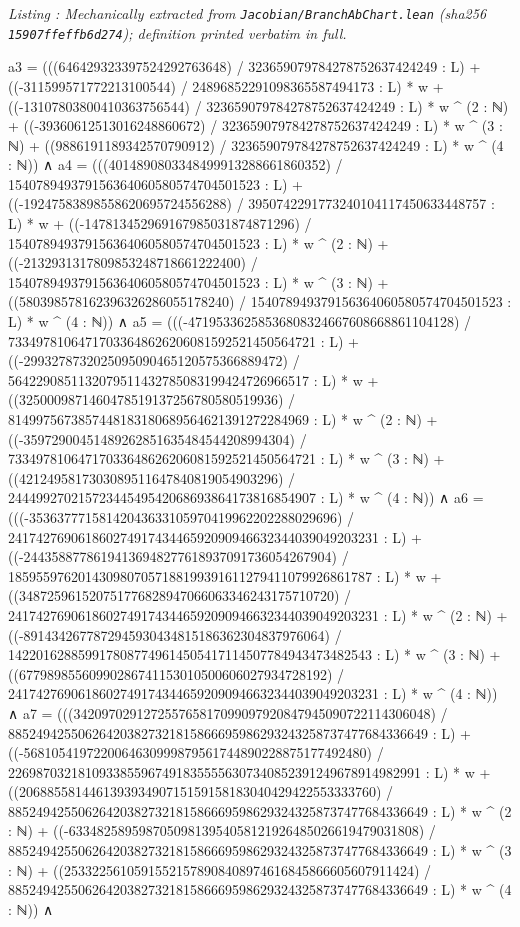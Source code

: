 \documentclass[a4paper,11pt]{article}
\newcounter{leanlisting}
\newenvironment{leanlisting}[2]{%
  \refstepcounter{leanlisting}\label{#2}%
  \begin{center}\textit{\small Listing \theleanlisting: #1}\end{center}%
  \Verbatim[breaklines=true,breakanywhere=true,fontsize=\footnotesize,frame=single,framesep=4pt,rulecolor=\color{gray!50},fillcolor=\color{gray!5}]%
}{%
  \endVerbatim%
}
\theoremstyle{plain}
\theoremstyle{definition}
\theoremstyle{remark}
\begin{document}
\begin{leanlisting}{Mechanically extracted from \texttt{Jacobian/BranchAbChart.lean} (sha256 \texttt{15907ffeffb6d274}); definition printed verbatim in full.}{lst:def-chartclass}
      a3 = (((646429323397524292763648) / 323659079784278752637424249 : L) + ((-311599571772213100544) / 24896852291098365587494173 : L) * w + ((-13107803800410363756544) / 323659079784278752637424249 : L) * w ^ (2 : ℕ) + ((-39360612513016248860672) / 323659079784278752637424249 : L) * w ^ (3 : ℕ) + ((9886191189342570790912) / 323659079784278752637424249 : L) * w ^ (4 : ℕ)) ∧
      a4 = (((4014890803348499913288661860352) / 154078949379156364060580574704501523 : L) + ((-19247583898558620695724556288) / 3950742291773240104117450633448757 : L) * w + ((-147813452969167985031874871296) / 154078949379156364060580574704501523 : L) * w ^ (2 : ℕ) + ((-2132931317809853248718661222400) / 154078949379156364060580574704501523 : L) * w ^ (3 : ℕ) + ((580398578162396326286055178240) / 154078949379156364060580574704501523 : L) * w ^ (4 : ℕ)) ∧
      a5 = (((-47195336258536808324667608668861104128) / 73349781064717033648626206081592521450564721 : L) + ((-2993278732025095090465120575366889472) / 5642290851132079511432785083199424726966517 : L) * w + ((3250009871460478519137256780580519936) / 8149975673857448183180689564621391272284969 : L) * w ^ (2 : ℕ) + ((-35972900451489262851635484544208994304) / 73349781064717033648626206081592521450564721 : L) * w ^ (3 : ℕ) + ((4212495817303089511647840819054903296) / 24449927021572344549542068693864173816854907 : L) * w ^ (4 : ℕ)) ∧
      a6 = (((-35363777158142043633105970419962202288029696) / 24174276906186027491743446592090946632344039049203231 : L) + ((-24435887786194136948277618937091736054267904) / 1859559762014309807057188199391611279411079926861787 : L) * w + ((348725961520751776828947066063346243175710720) / 24174276906186027491743446592090946632344039049203231 : L) * w ^ (2 : ℕ) + ((-8914342677872945930434815186362304837976064) / 1422016288599178087749614505417114507784943473482543 : L) * w ^ (3 : ℕ) + ((67798985560990286741153010500606027934728192) / 24174276906186027491743446592090946632344039049203231 : L) * w ^ (4 : ℕ)) ∧
      a7 = (((342097029127255765817099097920847945090722114306048) / 885249425506264203827321815866695986293243258737477684336649 : L) + ((-5681054197220064630999879561744890228875177492480) / 22698703218109338559674918355556307340852391249678914982991 : L) * w + ((206885581446139393490715159158183040429422553333760) / 885249425506264203827321815866695986293243258737477684336649 : L) * w ^ (2 : ℕ) + ((-63348258959870509813954058121926485026619479031808) / 885249425506264203827321815866695986293243258737477684336649 : L) * w ^ (3 : ℕ) + ((25332256105915521578908408974616845866605607911424) / 885249425506264203827321815866695986293243258737477684336649 : L) * w ^ (4 : ℕ)) ∧

\end{leanlisting}
\end{document}
